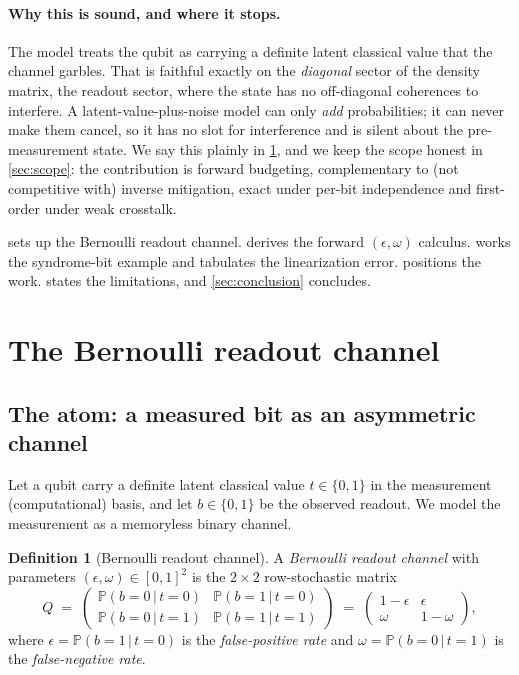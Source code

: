 \documentclass[a4paper,onecolumn,unpublished,nopdfoutputerror,allowtoday]{quantumarticle}
\numberwithin{equation}{section}
\theoremstyle{plain}
\theoremstyle{definition}
\newtheorem{definition}[theorem]{Definition}
\theoremstyle{remark}
\newcommand{\eps}{\epsilon}
\newcommand{\Prob}{\mathbb{P}}
\newcommand{\given}{\,\vert\,}
\newcommand{\bits}{\{0,1\}}
\begin{document}
\paragraph{Why this is sound, and where it stops.} The model treats the qubit
as carrying a definite latent classical value that the channel garbles. That is
faithful exactly on the \emph{diagonal} sector of the density matrix, the
readout sector, where the state has no off-diagonal coherences to interfere.
A latent-value-plus-noise model can only \emph{add} probabilities; it can never
make them cancel, so it has no slot for interference and is silent about the
pre-measurement state. We say this plainly in \cref{sec:channel}, and we keep
the scope honest in \cref{sec:scope}: the contribution is forward budgeting,
complementary to (not competitive with) inverse mitigation, exact under per-bit
independence and first-order under weak crosstalk.

 sets up the Bernoulli readout channel. 
derives the forward $(\eps,\omega)$ calculus.  works the
syndrome-bit example and tabulates the linearization error. 
positions the work.  states the limitations, and
\cref{sec:conclusion} concludes.


\section{The Bernoulli readout channel}
\label{sec:channel}

\subsection{The atom: a measured bit as an asymmetric channel}

Let a qubit carry a definite latent classical value $t\in\bits$ in the
measurement (computational) basis, and let $b\in\bits$ be the observed readout.
We model the measurement as a memoryless binary channel.

\begin{definition}[Bernoulli readout channel]
\label{def:atom}
A \emph{Bernoulli readout channel} with parameters $(\eps,\omega)\in[0,1]^2$ is
the $2\times2$ row-stochastic matrix
\begin{equation}
\label{eq:channel}
  Q \;=\;
  \begin{pmatrix} \Prob(b=0\given t=0) & \Prob(b=1\given t=0) \\[2pt]
                  \Prob(b=0\given t=1) & \Prob(b=1\given t=1) \end{pmatrix}
  \;=\;
  \begin{pmatrix} 1-\eps & \eps \\[2pt] \omega & 1-\omega \end{pmatrix},
\end{equation}
where $\eps = \Prob(b=1\given t=0)$ is the \emph{false-positive rate} and
$\omega = \Prob(b=0\given t=1)$ is the \emph{false-negative rate}.
\end{definition}
\end{document}
